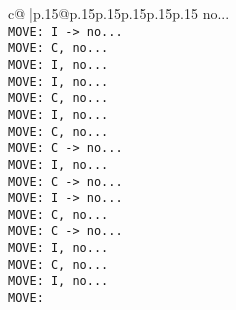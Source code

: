 \documentclass{article}
\begin{document}
{\begin{supertabular}{c@{$\;$}|p{.15\linewidth}@{}p{.15\linewidth}p{.15\linewidth}p{.15\linewidth}p{.15\linewidth}p{.15\linewidth}}
{{{ no...\\ \tt  MOVE: I -> no...\\ \tt  MOVE: C, no...\\ \tt  MOVE: I, no...\\ \tt  MOVE: I, no...\\ \tt  MOVE: C, no...\\ \tt  MOVE: I, no...\\ \tt  MOVE: C, no...\\ \tt  MOVE: C -> no...\\ \tt  MOVE: I, no...\\ \tt  MOVE: C -> no...\\ \tt  MOVE: I -> no...\\ \tt  MOVE: C, no...\\ \tt  MOVE: C -> no...\\ \tt  MOVE: I, no...\\ \tt  MOVE: C, no...\\ \tt  MOVE: I, no...\\ \tt  MOVE:}}}
\end{supertabular}}
\end{document}
